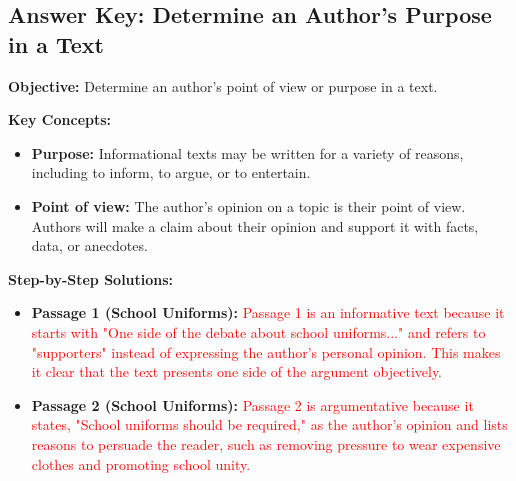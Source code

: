 \documentclass[12pt]{article}
\begin{document}
\subsection*{Answer Key: Determine an Author's Purpose in a Text}
\onehalfspacing

\begin{tcolorbox}[colframe=black!40, colback=gray!5, 
coltitle=black, colbacktitle=black!20, fonttitle=\bfseries\Large, 
title=Learning Objective, halign title=center, left=5pt, right=5pt, top=5pt, bottom=15pt]
\textbf{Objective:} Determine an author's point of view or purpose in a text.
\end{tcolorbox}

\vspace{1em}

\begin{tcolorbox}[colframe=black!60, colback=white, 
coltitle=black, colbacktitle=black!15, fonttitle=\bfseries\Large, 
title=Key Concepts and Vocabulary, halign title=center, left=10pt, right=10pt, top=10pt, bottom=15pt]
\textbf{Key Concepts:}
\begin{itemize}
    \item \textbf{Purpose:} Informational texts may be written for a variety of reasons, including to inform, to argue, or to entertain.
    \item \textbf{Point of view:} The author's opinion on a topic is their point of view. Authors will make a claim about their opinion and support it with facts, data, or anecdotes.
\end{itemize}
\end{tcolorbox}

\vspace{1em}

\begin{tcolorbox}[colframe=black!60, colback=white, 
coltitle=black, colbacktitle=black!15, fonttitle=\bfseries\Large, 
title=Examples, halign title=center, left=10pt, right=10pt, top=10pt, bottom=15pt]

\textbf{Step-by-Step Solutions:}
\begin{itemize}
    \item \textbf{Passage 1 (School Uniforms):} \textcolor{red}{Passage 1 is an informative text because it starts with "One side of the debate about school uniforms..." and refers to "supporters" instead of expressing the author's personal opinion. This makes it clear that the text presents one side of the argument objectively.}
    \item \textbf{Passage 2 (School Uniforms):} \textcolor{red}{Passage 2 is argumentative because it states, "School uniforms should be required," as the author's opinion and lists reasons to persuade the reader, such as removing pressure to wear expensive clothes and promoting school unity.}
\end{itemize}

\end{tcolorbox}
\end{document}

